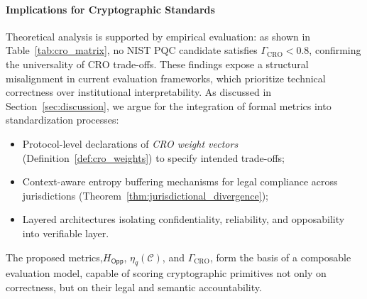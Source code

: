 \documentclass[preprint,12pt]{elsarticle}
\begin{document}
        \paragraph{Implications for Cryptographic Standards}
            Theoretical analysis is supported by empirical evaluation: as shown in Table~\ref{tab:cro_matrix}, no NIST PQC candidate satisfies $\Gamma_{\text{CRO}} < 0.8$, confirming the universality of CRO trade-offs. These findings expose a structural misalignment in current evaluation frameworks, which prioritize technical correctness over institutional interpretability. As discussed in Section~\ref{sec:discussion}, we argue for the integration of formal metrics into standardization processes:
            \begin{itemize}
                \item Protocol-level declarations of \emph{CRO weight vectors} (Definition~\ref{def:cro_weights}) to specify intended trade-offs;
                \item Context-aware entropy buffering mechanisms for legal compliance across jurisdictions (Theorem~\ref{thm:jurisdictional_divergence});
                \item Layered architectures isolating confidentiality, reliability, and opposability into verifiable layer.
            \end{itemize}
            The proposed metrics,$H_{\mathsf{Opp}}$, $\eta_q(\mathcal{C})$, and $\Gamma_{\text{CRO}}$, form the basis of a composable evaluation model, capable of scoring cryptographic primitives not only on correctness, but on their legal and semantic accountability.
\end{document}
